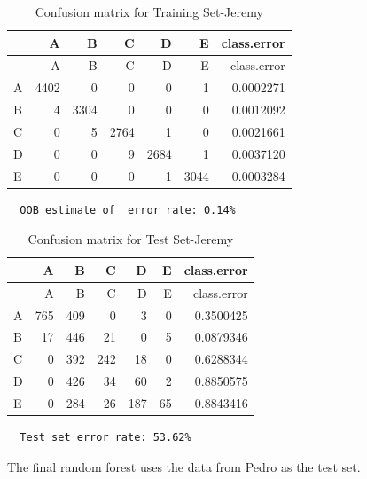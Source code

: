 \documentclass[12pt,twoside]{reedthesis}
\begin{document}
  \begin{longtable}[c]{@{}lrrrrrr@{}}
  \caption{Confusion matrix for Training Set-Jeremy}\tabularnewline
  \toprule
  & A & B & C & D & E & class.error\tabularnewline
  \midrule
  \endfirsthead
  \toprule
  & A & B & C & D & E & class.error\tabularnewline
  \midrule
  \endhead
  A & 4402 & 0 & 0 & 0 & 1 & 0.0002271\tabularnewline
  B & 4 & 3304 & 0 & 0 & 0 & 0.0012092\tabularnewline
  C & 0 & 5 & 2764 & 1 & 0 & 0.0021661\tabularnewline
  D & 0 & 0 & 9 & 2684 & 1 & 0.0037120\tabularnewline
  E & 0 & 0 & 0 & 1 & 3044 & 0.0003284\tabularnewline
  \bottomrule
  \end{longtable}
  
  \begin{verbatim}
  OOB estimate of  error rate: 0.14%
  \end{verbatim}
  
  \begin{longtable}[c]{@{}lrrrrrr@{}}
  \caption{Confusion matrix for Test Set-Jeremy}\tabularnewline
  \toprule
  & A & B & C & D & E & class.error\tabularnewline
  \midrule
  \endfirsthead
  \toprule
  & A & B & C & D & E & class.error\tabularnewline
  \midrule
  \endhead
  A & 765 & 409 & 0 & 3 & 0 & 0.3500425\tabularnewline
  B & 17 & 446 & 21 & 0 & 5 & 0.0879346\tabularnewline
  C & 0 & 392 & 242 & 18 & 0 & 0.6288344\tabularnewline
  D & 0 & 426 & 34 & 60 & 2 & 0.8850575\tabularnewline
  E & 0 & 284 & 26 & 187 & 65 & 0.8843416\tabularnewline
  \bottomrule
  \end{longtable}
  
  \begin{verbatim}
  Test set error rate: 53.62%
  \end{verbatim}
  
  The final random forest uses the data from Pedro as the test set.
  
  \begin{Shaded}
  \begin{Highlighting}[]
  \NormalTok{(}\NormalTok{)}
  
  \StringTok{ }\NormalTok{wl2[wl2$user_name ==}\StringTok{ }\NormalTok{subjects[}\NormalTok{], ]}
  \StringTok{ }\NormalTok{wl2[wl2$user_name !=}\StringTok{ }\NormalTok{subjects[}\NormalTok{], ]}
  \StringTok{ }\NormalTok{(} \NormalTok{OtherSubs6[, }\NormalTok{:}\NormalTok{], } 
                                  \NormalTok{Sub6[, }\NormalTok{:}\NormalTok{], } 
                                  \NormalTok{)}
  \end{Highlighting}
  \end{Shaded}
  
\end{document}

